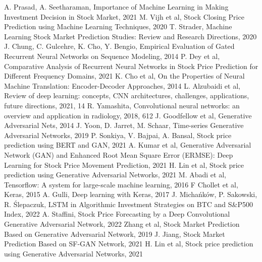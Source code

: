 \documentclass[11pt]{article} %
\begin{document}
\begin{thebibliography}{9}
A. Prasad, A. Seetharaman, Importance of Machine Learning in Making Investment Decision in Stock Market, 2021
M. Vijh et al, Stock Closing Price Prediction using Machine Learning Techniques, 2020
T. Strader, Machine Learning Stock Market Prediction Studies: Review and Research Directions, 2020
J. Chung, C. Gulcehre, K. Cho, Y. Bengio, Empirical Evaluation of Gated Recurrent Neural Networks on Sequence Modeling, 2014
P. Dey et al, Comparative Analysis of Recurrent Neural Networks in Stock Price Prediction for Different Frequency Domains, 2021 
K. Cho et al, On the Properties of Neural Machine Translation: Encoder-Decoder Approaches, 2014
L. Alzubaidi et al, Review of deep learning: concepts, CNN architectures, challenges, applications, future directions, 2021, 14
R. Yamashita, Convolutional neural networks: an overview and application in radiology, 2018, 612
J. Goodfellow et al, Generative Adversarial Nets, 2014
J. Yoon, D. Jarret, M. Schaar, Time-series Generative Adversarial Networks, 2019
P. Sonkiya, V. Bajpai, A. Bansal, Stock price prediction using BERT and GAN, 2021
A. Kumar et al, Generative Adversarial Network (GAN) and Enhanced Root Mean Square Error (ERMSE): Deep Learning for Stock Price Movement Prediction, 2021
H. Lin et al, Stock price prediction using Generative Adversarial Networks, 2021 
M. Abadi et al, Tensorflow: A system for large-scale machine learning, 2016
F Chollet et al, Keras, 2015
A. Gulli,  Deep learning with Keras, 2017
J. Michańków, P. Sakowski, R. Ślepaczuk, LSTM in Algorithmic Investment Strategies on BTC and S\&P500 Index, 2022
A. Staffini, Stock Price Forecasting by a Deep Convolutional Generative Adversarial Network, 2022
Zhang et al, Stock Market Prediction Based on Generative Adversarial Network, 2019
J. Jiang, Stock Market Prediction Based on SF-GAN Network, 2021
H. Lin et al, Stock price prediction using Generative Adversarial Networks, 2021

\end{thebibliography}
\end{document}
